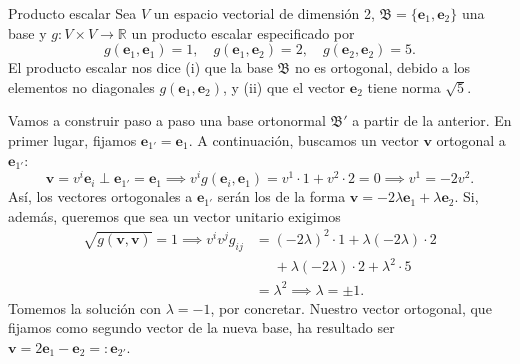 \begin{example}
    {Producto escalar
    \label{ex.2-productoescalar_I}
    }
    Sea \(V\) un espacio vectorial de dimensión 2, \(\mathfrak{B} = \{\mathbf{e}_1, \mathbf{e}_2\}\) una base y \(g:V\times V\rightarrow\mathbb{R}\) un producto escalar especificado por
    \begin{equation*}
        g(\mathbf{e}_1, \mathbf{e}_1) = 1,\quad g(\mathbf{e}_1, \mathbf{e}_2) = 2,\quad g(\mathbf{e}_2, \mathbf{e}_2) = 5.
    \end{equation*}
    El producto escalar nos dice (i) que la base \(\mathfrak{B}\) no es ortogonal, debido a los elementos no diagonales \(g(\mathbf{e}_1,\mathbf{e}_2)\), y (ii) que el vector \(\mathbf{e}_2\) tiene norma \(\sqrt{5}\).

    Vamos a construir paso a paso una base ortonormal \(\mathfrak{B}'\) a partir de la anterior. En primer lugar, fijamos \(\mathbf{e}_{1'} = \mathbf{e}_1\). A continuación, buscamos un vector \(\mathbf{v}\) ortogonal a \(\mathbf{e}_{1'}\):
    \begin{equation*}
        \mathbf{v} = v^{i}\mathbf{e}_{i} \perp \mathbf{e}_{1'} = \mathbf{e}_{1} \implies v^i g(\mathbf{e}_i,\mathbf{e}_1) = v^1\cdot 1 + v^2\cdot 2 = 0 \implies v^1 = -2v^2.
    \end{equation*}
    Así, los vectores ortogonales a \(\mathbf{e}_{1'}\) serán los de la forma \(\mathbf{v} = -2\lambda \mathbf{e}_{1} + \lambda \mathbf{e}_2\). Si, además, queremos que sea un vector unitario exigimos
    \begin{align*}
        \sqrt{g(\mathbf{v},\mathbf{v})} = 1 \implies v^iv^jg_{ij} &= (-2\lambda)^2\cdot 1 + \lambda(-2\lambda)\cdot 2 \\
        &\phantom{=}+ \lambda(-2\lambda)\cdot 2 + \lambda^2\cdot 5\\
        &= \lambda^2 \implies \lambda = \pm1.
    \end{align*}
    Tomemos la solución con \(\lambda = -1\), por concretar. Nuestro vector ortogonal, que fijamos como segundo vector de la nueva base, ha resultado ser \(\mathbf{v} = 2\mathbf{e}_1 - \mathbf{e}_2=: \mathbf{e}_{2'}\).


\end{example}
